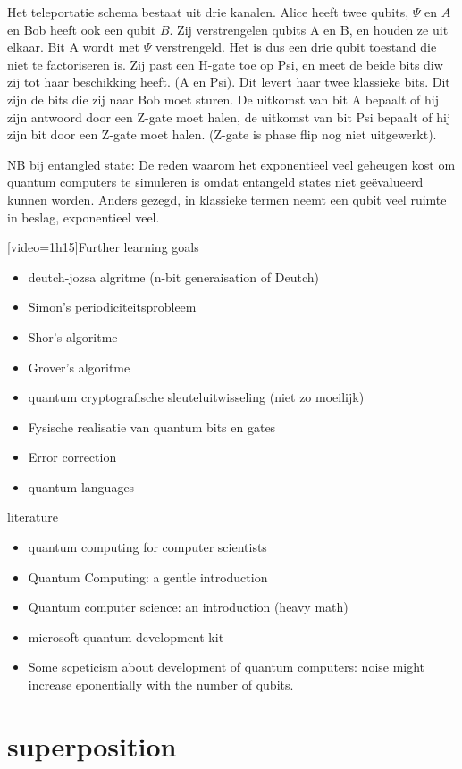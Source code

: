 \documentclass[../../main.tex]{subfiles}
\begin{document}
Het teleportatie schema bestaat uit drie kanalen. Alice heeft twee qubits, 
$\Psi$ en $A$ en Bob heeft ook een qubit $B$. Zij verstrengelen qubits A en B, en houden ze uit elkaar. Bit A wordt met $\Psi$ verstrengeld. Het is dus een drie qubit toestand die niet te factoriseren is. Zij past een H-gate toe op Psi, en meet de beide bits diw zij tot haar beschikking heeft. (A en Psi).
Dit levert haar twee klassieke bits. Dit zijn de bits die zij naar Bob moet sturen.
 De uitkomst van bit A bepaalt of hij zijn antwoord door een Z-gate moet halen, de uitkomst van bit Psi bepaalt of hij zijn bit door een Z-gate moet halen. (Z-gate is phase flip nog niet uitgewerkt).
 


NB bij entangled state: De reden waarom het exponentieel veel geheugen kost om quantum computers te simuleren is omdat entangeld states niet ge\"evalueerd kunnen worden. Anders gezegd, in klassieke termen neemt een qubit veel ruimte in beslag, exponentieel veel. 

[video=1h15]Further learning goals
\begin{itemize}[noitemsep]
\item deutch-jozsa algritme (n-bit generaisation of Deutch)
\item Simon's periodiciteitsprobleem
\item Shor's algoritme
\item Grover's algoritme
\item quantum cryptografische sleuteluitwisseling (niet zo moeilijk)
\item Fysische realisatie van quantum bits en gates 
\item Error correction
\item quantum languages
\end{itemize}

literature
\begin{itemize}[noitemsep]
\item quantum computing for computer scientists
\item Quantum Computing: a gentle introduction
\item Quantum computer science: an introduction (heavy math)
\item microsoft quantum development kit
\item Some scpeticism about development of quantum computers: noise might increase eponentially with the number of qubits.
\end{itemize}

\section{superposition}
\end{document}

